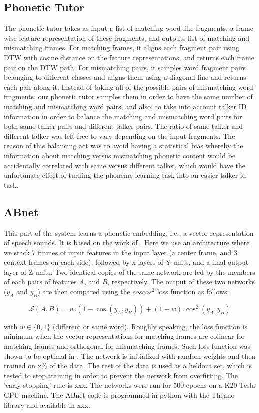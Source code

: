 \documentclass[a4paper]{article}
\begin{document}
\subsection{Phonetic Tutor}
The phonetic tutor takes as input a list of matching word-like fragments, a frame-wise feature representation of these fragments, and outputs list of matching and mismatching frames. For matching frames, it aligns each fragment pair using DTW with cosine distance on the feature representations, and returns each frame pair on the DTW path. For mismatching pairs, it samples word fragment pairs belonging to different classes and aligns them using a diagonal line and returns each pair along it. Instead of taking all of the possible pairs of mismatching word fragments, our phonetic tutor samples them in order to have the same number of matching and mismatching word pairs, and also, to take into account talker ID information in order to balance the matching and mismatching word pairs for both same talker pairs and different talker pairs. The ratio of same talker and different talker was left free to vary depending on the input fragments. The reason of this balancing act was to avoid having a statistical bias whereby the information about matching versus mismatching phonetic content would be accidentally correlated with same versus different talker, which would have the unfortunate effect of turning the phoneme learning task into an easier talker id task.

\subsection{ABnet}
This part of the system learns a phonetic embedding, i.e., a vector representation of speech sounds. It is based on the work of \cite{synnaeve}. Here we use an architecture where we stack 7 frames of input features in the input layer (a center frame, and 3 context frames on each side), followed by x layers of Y units, and a final output layer of Z units. Two identical copies of the same network are fed by the members of each pairs of features $A$, and $B$, respectively. The output of these two networks ($y_A$ and $y_B$) are then compared using the $coscos^2$ loss function as follows:

\begin{equation}
\mathcal{L}(A,B) = w.(1-\cos(y_{A}, y_{B})) + (1-w).\cos^2(y_{A}, y_{B})
\end{equation}

with $w \in \{0,1\}$ (different or same word). Roughly speaking, the loss function is minimum when the vector representations for matching frames are colinear for matching frames and orthogonal for mismatching frames. Such loss function was shown to be optimal in \cite{synnaeve}. The network is initialized with random weights and then trained on x\% of the data. The rest of the data is used as a heldout set, which is tested to stop training in order to prevent the network from overfitting. The  'early stopping' rule is xxx. The networks were run for 500 epochs on a K20 Tesla GPU machine. The ABnet code is programmed in python with the Theano library and available in xxx.
\end{document}
